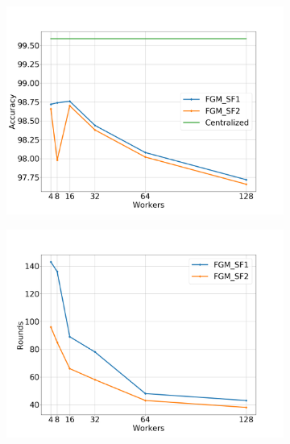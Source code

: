 \begin{figure}[H]
    \centering
    \begin{subfigure}[b]{0.48\textwidth}
        \includegraphics[width=\textwidth]{./images/results/sf-comp/exp_Fig_3_1.png}
        \caption{}
    \end{subfigure}
    \begin{subfigure}[b]{0.48\textwidth}
        \includegraphics[width=\textwidth]{./images/results/sf-comp/exp_Fig_3_2.png}
        \caption{}
    \end{subfigure}
    \begin{subfigure}[b]{0.50\textwidth}

\end{subfigure}
\end{figure}
